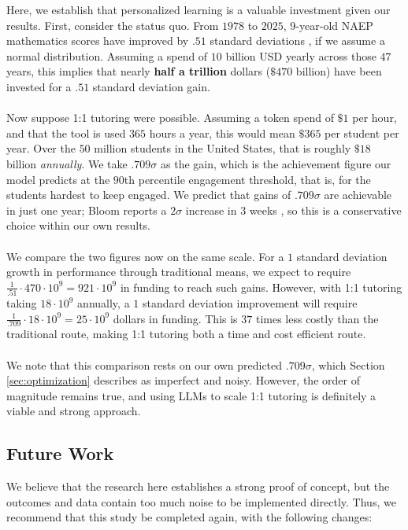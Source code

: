 \documentclass[12pt]{article}
\begin{document}
Here, we establish that personalized learning is a valuable investment given our results. First, consider the status quo. From $1978$ to $2025$, 9-year-old NAEP mathematics scores have improved by $.51$ standard deviations \cite{naep2025math9}, if we assume a normal distribution. Assuming a spend of $10$ billion USD yearly across those $47$ years, this implies that nearly \textbf{half a trillion} dollars ($\$470$ billion) have been invested for a $.51$ standard deviation gain.
\\\\
Now suppose 1:1 tutoring were possible. Assuming a token spend of $\$1$ per hour, and that the tool is used $365$ hours a year, this would mean $\$365$ per student per year. Over the $50$ million students in the United States, that is roughly $\$18$ billion \emph{annually}. We take $.709\sigma$ as the gain, which is the achievement figure our model predicts at the $90$th percentile engagement threshold, that is, for the students hardest to keep engaged. We predict that gains of $.709\sigma$ are achievable in just one year; Bloom reports a $2\sigma$ increase in $3$ weeks \cite{bloom1984sigma}, so this is a conservative choice within our own results.
\\\\
We compare the two figures now on the same scale. For a $1$ standard deviation growth in performance through traditional means, we expect to require $\frac{1}{.51} \cdot 470\cdot 10^9 = 921\cdot 10^9$ in funding to reach such gains. However, with 1:1 tutoring taking $18\cdot 10^9$ annually, a $1$ standard deviation improvement will require $\frac{1}{.709}\cdot 18\cdot 10^9 = 25 \cdot 10^9$ dollars in funding. This is $37$ times less costly than the traditional route, making 1:1 tutoring both a time and cost efficient route.
\\\\
We note that this comparison rests on our own predicted $.709\sigma$, which Section \ref{sec:optimization} describes as imperfect and noisy. However, the order of magnitude remains true, and using LLMs to scale 1:1 tutoring is definitely a viable and strong approach.

\subsection{Future Work}
We believe that the research here establishes a strong proof of concept, but the outcomes and data contain too much noise to be implemented directly. Thus, we recommend that this study be completed again, with the following changes:
\end{document}
